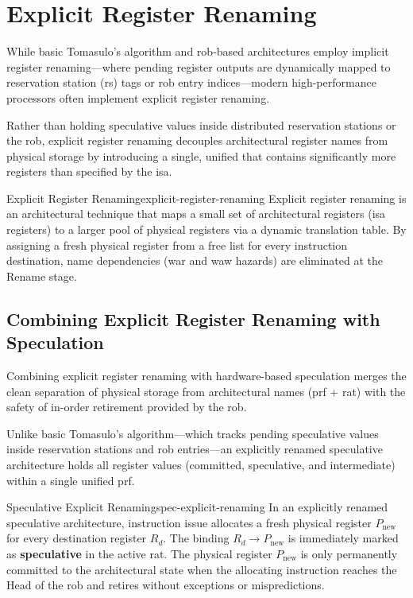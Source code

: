 \section{Explicit Register Renaming}
\label{sec:explicit_register_renaming}

While basic Tomasulo's algorithm and \gls{rob}-based architectures employ implicit register renaming—where pending register outputs are dynamically mapped to reservation station (\gls{rs}) tags or \gls{rob} entry indices—modern high-performance processors often implement explicit register renaming. 

Rather than holding speculative values inside distributed reservation stations or the \gls{rob}, explicit register renaming decouples architectural register names from physical storage by introducing a single, unified  that contains significantly more registers than specified by the \gls{isa}.

\begin{definition}{Explicit Register Renaming}{explicit-register-renaming}
    Explicit register renaming is an architectural technique that maps a small set of architectural registers (\gls{isa} registers) to a larger pool of physical registers via a dynamic translation table. By assigning a fresh physical register from a free list for every instruction destination, name dependencies (\gls{war} and \gls{waw} hazards) are eliminated at the Rename stage.
\end{definition}

\subsection{Combining Explicit Register Renaming with Speculation}
\label{subsec:explicit_renaming_speculation}

Combining explicit register renaming with hardware-based speculation merges the clean separation of physical storage from architectural names (\gls{prf} + \gls{rat}) with the safety of in-order retirement provided by the \gls{rob}. 

Unlike basic Tomasulo's algorithm—which tracks pending speculative values inside reservation stations and \gls{rob} entries—an explicitly renamed speculative architecture holds all register values (committed, speculative, and intermediate) within a single unified \gls{prf}.

\begin{definition}{Speculative Explicit Renaming}{spec-explicit-renaming}
    In an explicitly renamed speculative architecture, instruction issue allocates a fresh physical register $P_{\text{new}}$ for every destination register $R_d$. The binding $R_d \to P_{\text{new}}$ is immediately marked as \textbf{speculative} in the active \gls{rat}. The physical register $P_{\text{new}}$ is only permanently committed to the architectural state when the allocating instruction reaches the Head of the \gls{rob} and retires without exceptions or mispredictions.
\end{definition}

